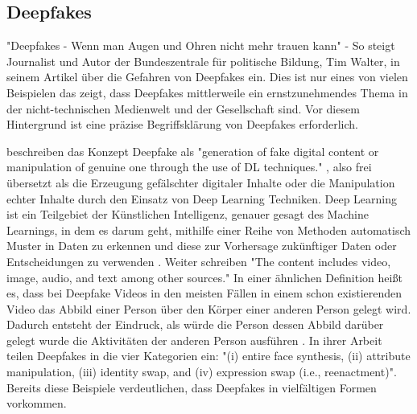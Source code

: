 \subsection{Deepfakes}
"Deepfakes - Wenn man Augen und Ohren nicht mehr trauen kann" \cite{bildungDeepfakesWennMan2023} - 
So steigt Journalist und Autor der Bundeszentrale für politische Bildung, Tim Walter, in seinem Artikel über die Gefahren von Deepfakes ein. 
Dies ist nur eines von vielen Beispielen das zeigt,
dass Deepfakes mittlerweile ein ernstzunehmendes Thema in der nicht-technischen Medienwelt und der Gesellschaft sind. 
Vor diesem Hintergrund ist eine präzise Begriffsklärung von Deepfakes erforderlich.

\textcite{gambinDeepfakesCurrentFuture2024} beschreiben das Konzept Deepfake als 
"generation of fake digital content or manipulation of genuine one through the use of DL techniques." \cite[S.3]{gambinDeepfakesCurrentFuture2024},
also frei übersetzt als die Erzeugung gefälschter digitaler Inhalte oder die Manipulation echter Inhalte durch den Einsatz von Deep Learning Techniken. 
Deep Learning ist ein Teilgebiet der Künstlichen Intelligenz, genauer gesagt des Machine Learnings, in dem es darum geht, 
mithilfe einer Reihe von Methoden automatisch Muster in Daten zu erkennen 
und diese zur Vorhersage zukünftiger Daten oder Entscheidungen zu verwenden \cite{murphyMachineLearningProbabilistic2012}. 
Weiter schreiben \textcite{gambinDeepfakesCurrentFuture2024} "The content includes video, image, audio, and text among other sources." \cite[S.3]{gambinDeepfakesCurrentFuture2024} 
In einer ähnlichen Definition heißt es, 
dass bei Deepfake Videos in den meisten Fällen in einem schon existierenden Video das Abbild einer Person über den Körper einer anderen Person gelegt wird. 
Dadurch entsteht der Eindruck, als würde die Person dessen Abbild darüber gelegt wurde die Aktivitäten der anderen Person ausführen \cite{harrisVideoDemandWhat2021}.
In ihrer Arbeit teilen \textcite{juefei-xuCounteringMaliciousDeepFakes2022} Deepfakes in die vier Kategorien ein:
"(i) entire face synthesis, (ii) attribute manipulation, (iii) identity swap, and (iv) expression swap (i.e., reenactment)"\cite[S.2]{juefei-xuCounteringMaliciousDeepFakes2022}.
Bereits diese Beispiele verdeutlichen, dass Deepfakes in vielfältigen Formen vorkommen.

